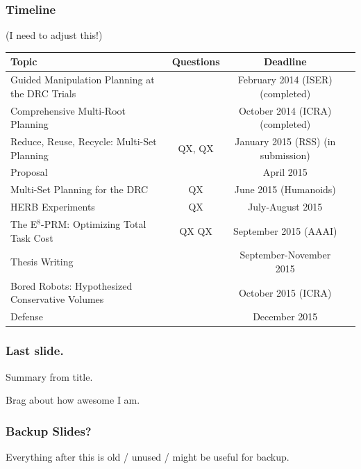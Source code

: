 \documentclass[serif]{beamer}
\begin{document}
\begin{frame}
   \frametitle{Timeline}
   
   (I need to adjust this!)
   
   \scriptsize{\renewcommand{\arraystretch}{1.3}
   \begin{tabular}{lccl}
   \toprule
   {\bf Topic} & {\bf Questions} & {\bf Deadline} \\
   \midrule
   Guided Manipulation Planning at the DRC Trials
      &
      & February 2014 (ISER) (completed) \\
   Comprehensive Multi-Root Planning
      &
      & October 2014 (ICRA) (completed) \\
   Reduce, Reuse, Recycle: Multi-Set Planning
      & QX, QX
      & January 2015 (RSS) (in submission) \\
   \midrule
   Proposal
      & & April 2015 \\
   Multi-Set Planning for the DRC
      & QX
      & June 2015 (Humanoids) \\
   HERB Experiments
      & QX
      & July-August 2015 \\
   The E$^8$-PRM: Optimizing Total Task Cost
      & QX QX
      & September 2015 (AAAI) \\
   Thesis Writing
      & & September-November 2015 \\
   Bored Robots: Hypothesized Conservative Volumes
      & & October 2015 (ICRA) \\
   Defense
      & & December 2015 \\
   \bottomrule
   \end{tabular}
   } %
   
\end{frame}

\begin{frame}
   \frametitle{Last slide.}
   
   Summary from title.
   
   Brag about how awesome I am.
   
\end{frame}

{
\begin{frame}
\end{frame}
}

\begin{frame}
   \frametitle{Backup Slides?}
   
   Everything after this is old / unused / might be useful for backup.
   
\end{frame}
\end{document}
